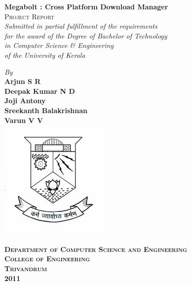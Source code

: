 \begin{titlepage}
  \begin{center}
    {\huge \bfseries Megabolt : Cross Platform Download Manager}\\[1cm]
    \textsc{\large Project Report}\\[7.5mm]
           {\large \it Submitted in partial fulfillment of the requirements\\ for the award of the
             Degree of Bachelor of Technology\\ in Computer Science \& Engineering\\ of the University of Kerala}
           \begin{center}
             \large
             \centering
             \emph{ By}\\ \vspace{1mm}
                  {\bf Arjun \textsc{S R} }\\ \vspace{1mm}
                  {\bf Deepak Kumar \textsc{N D}}\\ \vspace{1mm}
                  {\bf Joji Antony}\\ \vspace{1mm}
                  {\bf Sreekanth Balakrishnan}\\ \vspace{1mm}
                  {\bf Varun \textsc{V V}}\\ \vspace{1mm}
                  \includegraphics[scale=0.90]{pic/cetemblem.jpg}
           \end{center}
               {\textsc \bf \large Department of Computer Science and Engineering\\ College of Engineering\\ Trivandrum\\ 2011 }
  \end{center}
\end{titlepage}
